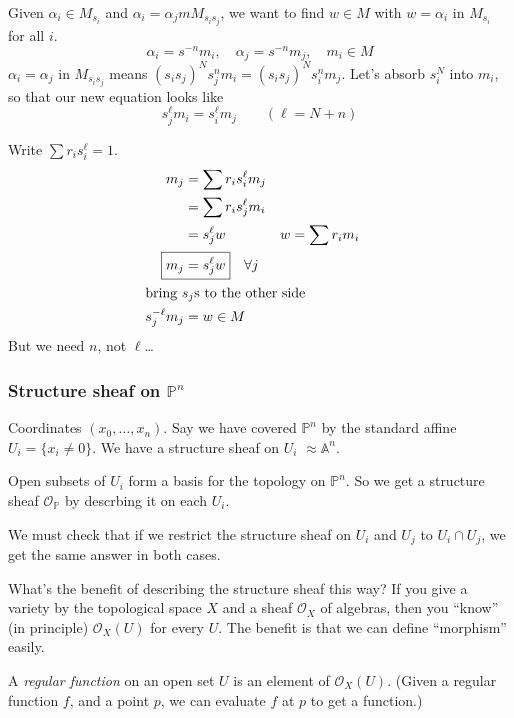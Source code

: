 \documentclass [letterpaper,11pt,twoside]{article}
\begin{document}
      Given $\alpha_i \in M_{s_i}$ and $\alpha_i = \alpha_j m M_{s_i s_j}$, we
      want to find $w\in M$ with $w = \alpha_i$ in $M_{s_i}$ for all $i$.
      $$\alpha_i = s^{-n} m_i,\quad \alpha_j = s^{-n}m_j, \quad m_i \in M$$
      $\alpha_i = \alpha_j$ in $M_{s_i s_j}$ means $(s_is_j)^N s_j^n m_i = (s_i
      s_j)^N s_i^n m_j$.  Let's absorb $s_i^N$ into $m_i$, so that our new
      equation looks like
      $$\boxed{s_j^\ell m_i = s_i^\ell m_j} \qquad (\ell = N + n)$$

      Write $\sum r_i s_i^\ell = 1$.
      \begin{align*}
        m_j & = \sum r_i s_i^\ell m_j \\
            & = \sum r_i s_j^\ell m_i \\
            & = s_j^\ell w & w & = \sum r_i m_i \\
        \Aboxed{m_j & = s_j^\ell w}\quad \forall j \\
        \intertext{bring $s_j$s to the other side}
        s_j^{-\ell}m_j & = w \in M
      \end{align*}
      But we need $n$, not $\ell$\ldots

    \subsubsection*{Structure sheaf on \texorpdfstring{$\mathbb P^n$}{$\mathbb
    P^n$}}
      Coordinates $(x_0, \ldots, x_n)$.  Say we have covered $\mathbb P^n$ by
      the standard affine $U_i = \{x_i \ne 0\}$.  We have a structure sheaf on
      $U_i$ $ \approx \mathbb A^n$.

      Open subsets of $U_i$ form a basis for the topology on $\mathbb P^n$.  So
      we get a structure sheaf $\mathcal O_{\mathbb P}$ by descrbing it on each
      $U_i$.

      We must check that if we restrict the structure sheaf on $U_i$ and
      $U_j$ to $U_i \cap U_j$, we get the same answer in both cases.

    What's the benefit of describing the structure sheaf this way?  If you give
    a variety by the topological space $X$ and a sheaf $\mathcal O_X$ of
    algebras, then you ``know'' (in principle) $\mathcal O_X(U)$ for every $U$.
    The benefit is that we can define ``morphism'' easily.

    \begin{defn*}
      A \emph{regular function} on an open set $U$ is an element of $\mathcal
      O_X(U)$.  (Given a regular function $f$, and a point $p$, we can evaluate
      $f$ at $p$ to get a function.)
    \end{defn*}
\end{document}
